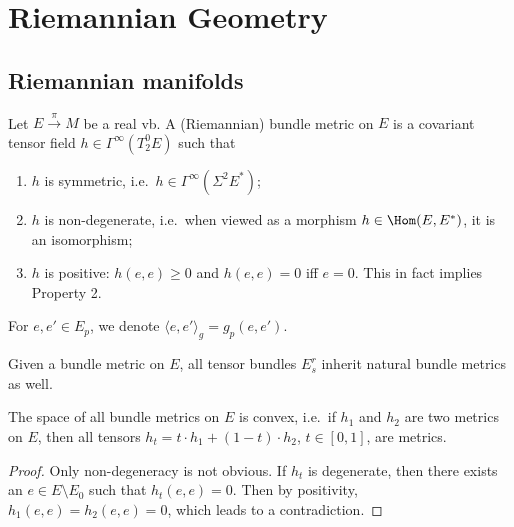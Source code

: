 \newpage
\section{Riemannian Geometry}

\subsection{Riemannian manifolds}\label{sec: Riemannian mfds}


\begin{defn}
Let $E\overset\pi\to M$ be a real \gls{vb}. A (Riemannian) bundle metric on $E$ is a covariant tensor field $h\in\Gamma^\infty(T^0_2 E)$ such that
\begin{enumerate}
    \item $h$ is symmetric, i.e.\ $h\in\Gamma^\infty(\Sigma^2 E^\ast)$;
    \item $h$ is non-degenerate, i.e.\ when viewed as a morphism $h\in\Hom(E,E^\ast)$, it is an isomorphism;
    \item $h$ is positive: $h(e,e)\geq 0$ and $h(e,e)=0$ iff $e=0$. This in fact implies Property 2.
\end{enumerate}
For $e,e'\in E_p$, we denote $\langle e,e'\rangle_g=g_p(e,e')$.
\end{defn}

Given a bundle metric on $E$, all tensor bundles $E^r_s$ inherit natural bundle metrics as well.

\begin{prop}
The space of all bundle metrics on $E$ is convex, i.e.\ if $h_1$ and $h_2$ are two metrics on $E$, then all tensors $h_t=t \cdot h_1+(1-t)\cdot h_2$, $t\in[0,1]$, are metrics.
\end{prop}
\begin{proof}
Only non-degeneracy is not obvious. If $h_t$ is degenerate, then there exists an $e\in E\setminus E_0$ such that $h_t(e,e)=0$. Then by positivity, $h_1(e,e)=h_2(e,e)=0$, which leads to a contradiction.
\end{proof}

